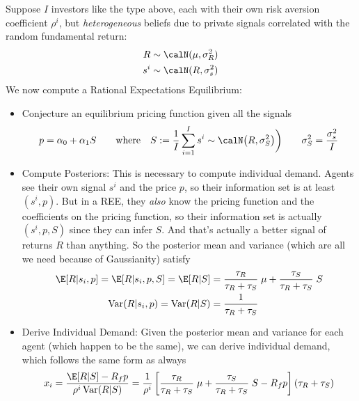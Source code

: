 \documentclass[12pt]{article}
\theoremstyle{plain}
\theoremstyle{definition}
\theoremstyle{remark}
\newcommand{\Var}{\operatorname{Var}}
\begin{document}
Suppose $I$ investors like the type above, each with their own risk
aversion coefficient $\rho^i$, but \emph{heterogeneous} beliefs due to
private signals correlated with the random fundamental return:
\begin{align*}
  R &\sim \calN(\mu,\sigma^2_R) \\
  s^i &\sim \calN(R, \sigma^2_s)
\end{align*}
We now compute a Rational Expectations Equilibrium:
\begin{itemize}
  \item Conjecture an equilibrium pricing function given all the signals
    \begin{align*}
      p = \alpha_0 + \alpha_1
      S
      \qquad\text{where}\quad
      S
      :=
      \frac{1}{I}\sum_{i=1}^I s^i
      \sim
      \calN\big(R, \sigma^2_{S}\big)
      \bigg)
      \qquad
      \sigma^2_{S}
      =
      \frac{\sigma^2_s}{I}
    \end{align*}

  \item
    Compute Posteriors:
    This is necessary to compute individual demand.
    Agents see their own signal $s^i$ and the price $p$, so their
    information set is at least $(s^i,p)$.
    But in a REE, they \emph{also} know the pricing function and the
    coefficients on the pricing function, so their information set is
    actually $(s^i,p,S)$ since they can infer $S$.
    And that's actually a better signal of returns $R$ than anything.
    So the posterior mean and variance (which are all we need because of
    Gaussianity) satisfy
    \begin{align*}
      \E[R|s_i,p]
      = \E[R|s_i,p,S]
      = \E[R|S]
      &=
      \frac{\tau_R}{\tau_R+\tau_{S}}
      \;\mu
      + \frac{\tau_{S}}{\tau_R+\tau_{S}}
      \;
      S
      \\
      \Var(R|s_i,p)
      =
      \Var(R|S)
      &=
      \frac{1}{\tau_R+\tau_{S}}
    \end{align*}

  \item
    Derive Individual Demand:
    Given the posterior mean and variance for each agent (which happen
    to be the same), we can derive individual demand, which follows the
    same form as always
    \begin{align*}
      x_i
      =
      \frac{\E[R|S]-R_fp}{\rho^i \Var(R|S)}
      =
      \frac{1 }{\rho^i}
      \left[
        \frac{\tau_R}{\tau_R+\tau_{S}}
        \;\mu
        + \frac{\tau_{S}}{\tau_R+\tau_{S}}
        \;
        S
        -R_fp
      \right]
      (\tau_R+\tau_{S})
    \end{align*}



\end{itemize}
\end{document}

